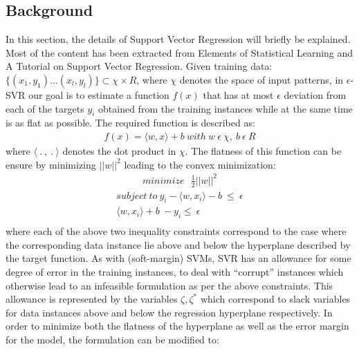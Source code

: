 \documentclass[12pt]{article}
\begin{document}
\subsection{Background}
\label{Background} 
In this section, the details of Support Vector Regression will briefly be explained. Most of the content has been extracted from Elements of Statistical Learning and A Tutorial on Support Vector Regression.
\newline\newline
 Given training data: $\{(x_{1}, y_{1})\dots(x_{l}, y_{l})\}\subset \chi \times R$, where $\chi$ denotes the space of input patterns, in $\epsilon$-SVR our goal is to estimate a function $f(x)$ that has at most $\epsilon$ deviation from each of the targets $y_{i}$ obtained from the training instances while at the same time is as flat as possible. The required function is described as:  
 \begin{gather*} 
f(x) = \langle w, x\rangle + b \ with\  w\  \epsilon\ \chi, \ b\ \epsilon\ R
 \end{gather*}
 where $\langle\ .\ ,\ .\ \rangle$ denotes the dot product in $\chi$. The flatness of this function can be ensure by minimizing $||w||^2$ leading to the convex minimization:
\belowdisplayskip=0pt
 \begin{gather*} 
minimize\ \ \ \frac{1}{2}||w||^2
\end{gather*}
\begin{align*}
subject\ to\ y_{i} - \langle w, x_{i}\rangle - b\ \leq\ \epsilon\\ 
\langle w, x_{i}\rangle + b\ - y_{i} \leq\ \epsilon\\
 \end{align*}
where each of the above two inequality constraints correspond to the case where the corresponding data instance lie above and below the hyperplane described by the target function.
\newline\newline
As with (soft-margin) SVMs, SVR has an allowance for some degree of error in the training instances, to deal with ``corrupt''  instances which otherwise lead to an infeasible  formulation as per the above constraints. This allowance is represented by the variables $\zeta, \zeta^*$ which correspond to slack variables for data instances above and below the regression hyperplane respectively. 
\newline\newline
 In order to minimize both the flatness of the hyperplane as well as the error margin for the model, the formulation can be modified to:
\end{document}
